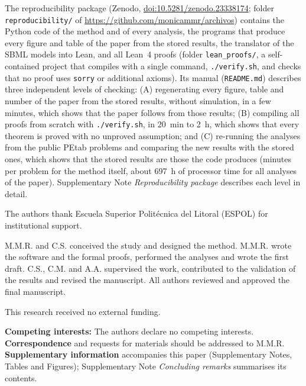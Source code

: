 \documentclass[pdflatex,sn-nature]{sn-jnl}
\theoremstyle{plain}
\newcommand{\zenododoi}{10.5281/zenodo.23338174}
\begin{document}
The reproducibility package (Zenodo, \href{https://doi.org/\zenododoi}{doi:\zenododoi}; folder \texttt{reproducibility/} of \url{https://github.com/monicammr/archivos}) contains the Python code of the method and of every analysis, the programs that produce every figure and table of the paper from the stored results, the translator of the SBML models into Lean, and all Lean~4 proofs (folder \texttt{lean\_proofs/}, a self-contained project that compiles with a single command, \texttt{./verify.sh}, and checks that no proof uses \texttt{sorry} or additional axioms). Its manual (\texttt{README.md}) describes three independent levels of checking: (A) regenerating every figure, table and number of the paper from the stored results, without simulation, in a few minutes, which shows that the paper follows from those results; (B) compiling all proofs from scratch with \texttt{./verify.sh}, in 20~min to 2~h, which shows that every theorem is proved with no unproved assumption; and (C) re-running the analyses from the public PEtab problems and comparing the new results with the stored ones, which shows that the stored results are those the code produces (minutes per problem for the method itself, about 697~h of processor time for all analyses of the paper). Supplementary Note \textit{Reproducibility package} describes each level in detail.




The authors thank Escuela Superior Polit\'ecnica del Litoral (ESPOL) for institutional support.

M.M.R. and C.S. conceived the study and designed the method. M.M.R. wrote the software and the formal proofs, performed the analyses and wrote the first draft. C.S., C.M. and A.A. supervised the work, contributed to the validation of the results and revised the manuscript. All authors reviewed and approved the final manuscript.

This research received no external funding.

\textbf{Competing interests:} The authors declare no competing interests.\\
\textbf{Correspondence} and requests for materials should be addressed to M.M.R.\\
\textbf{Supplementary information} accompanies this paper (Supplementary Notes, Tables and Figures); Supplementary Note \textit{Concluding remarks} summarises its contents.
\end{document}
